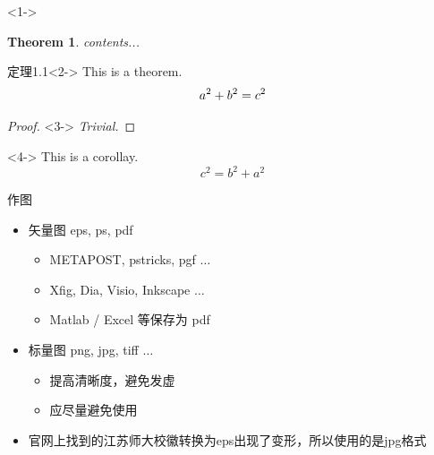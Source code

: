 \documentclass{beamer}
\newtheorem{thm}{Theorem}[theorem]
\begin{document}
	\begin{frame}<1->
		 \begin{thm}
	        contents...
	        \label{thm-1}
		 \end{thm}
		\begin{block}{定理1.1}<2->
            This is a theorem.
            \begin{equation}
                a^2 + b^2 = c^2
            	\notag	%
            	\label{equ-3}
            	\end{equation}
        \end{block}
    	
		\begin{proof}<3->
            \textit{Trivial.} 
        \end{proof}
		            
        \begin{corollary}<4->
            This is a corollay.
            \begin{equation}
                c^2 = b^2 + a^2
                \label{equ-4}
            \end{equation}
        \end{corollary}
	\end{frame}
	
	\begin{frame}{作图}
		\begin{itemize}
			\item 矢量图 eps, ps, pdf
			\begin{itemize}
				\item METAPOST, pstricks, pgf $\ldots$
				\item Xfig, Dia, Visio, Inkscape $\ldots$
				\item Matlab / Excel 等保存为 pdf
			\end{itemize}
			\item 标量图 png, jpg, tiff $\ldots$
			\begin{itemize}
				\item 提高清晰度，避免发虚
				\item 应尽量避免使用
			\end{itemize}
		\item 官网上找到的江苏师大校徽转换为eps出现了变形，所以使用的是jpg格式
		\end{itemize}
		
	\end{frame}
\end{document}
